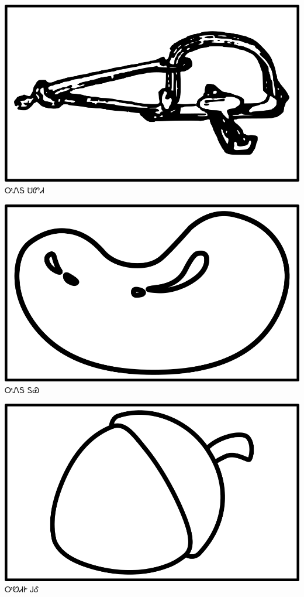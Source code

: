 \documentclass[avery5371]{flashcards}%
\begin{document}
    \begin{flashcard}{
        \includegraphics[width=0.95\columnwidth,height=.51\columnwidth,keepaspectratio]{../artwork/objects-neutral/sadvdi}
    }
        \Huge ᎤᏁᎦ ᏌᏛᏗ
    \end{flashcard}

    \begin{flashcard}{
        \includegraphics[width=0.95\columnwidth,height=.51\columnwidth,keepaspectratio]{../artwork/objects-neutral/tuya}
    }
        \Huge ᎤᏁᎦ ᏚᏯ
    \end{flashcard}

    \begin{flashcard}{
        \includegraphics[width=0.95\columnwidth,height=.51\columnwidth,keepaspectratio]{../artwork/objects-neutral/gule}
    }
        \Huge ᎤᏬᏗᎨ ᎫᎴ
    \end{flashcard}
\end{document}

